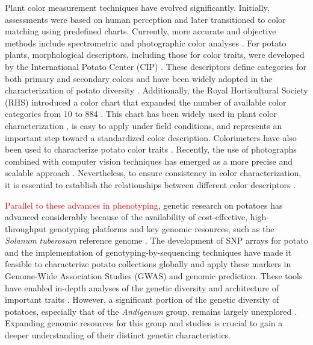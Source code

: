 \documentclass[pdflatex,sn-mathphys-ay]{sn-jnl}%
\begin{document}
Plant color measurement techniques have evolved significantly. Initially, assessments were based on human perception and later transitioned to color matching using predefined charts. Currently, more accurate and objective methods include spectrometric and photographic color analyses \citep{kasajima2019measuring}. For potato plants, morphological descriptors, including those for color traits, were developed by the International Potato Center (CIP) \citep{huaman1977descriptors,gomez2000guia}. These descriptors define categories for both primary and secondary colors and have been widely adopted in the characterization of potato diversity \citep{behn2023phenolic, Berdugo2017, larico2024descripcion}. Additionally, the Royal Horticultural Society (RHS) introduced a color chart that expanded the number of available color categories from 10 to 884 \citep{RHS2015}. This chart has been widely used in plant color characterization \citep{tang2014effects}, is easy to apply under field conditions, and represents an important step toward a standardized color description. Colorimeters have also been used to characterize potato color traits \citep{thornton2013influence}. Recently, the use of photographs combined with computer vision techniques has emerged as a more precise and scalable approach \citep{miller2023tubar,yusuf2024genomic,azizi2016identifying,ropelewska2021effect,feldman2024}. Nevertheless, to ensure consistency in color characterization, it is essential to establish the relationships between different color descriptors \citep{voss1992relating,ayala2006evaluation}. 

\textcolor{red}{Parallel to these advances in phenotyping}, genetic research on potatoes has advanced considerably because of the availability of cost-effective, high-throughput genotyping platforms and key genomic resources, such as the \textit{Solanum tuberosum} reference genome \citep{xu2011genome,Pham2020}. The development of SNP arrays for potato \citep{felcher2012integration, vos2015development} and the implementation of genotyping-by-sequencing techniques \citep{sharma2024genotyping} have made it feasible to characterize potato collections globally and apply these markers in Genome-Wide Association Studies (GWAS) and genomic prediction. These tools have enabled in-depth analyses of the genetic diversity and architecture of important traits \citep{sharma2024genotyping, pandey2021genetic}. However, a significant portion of the genetic diversity of potatoes, especially that of the \textit{Andigenum} group, remains largely unexplored \citep{ghislain2020genes}. Expanding genomic resources for this group and studies is crucial to gain a deeper understanding of their distinct genetic characteristics.
\end{document}
